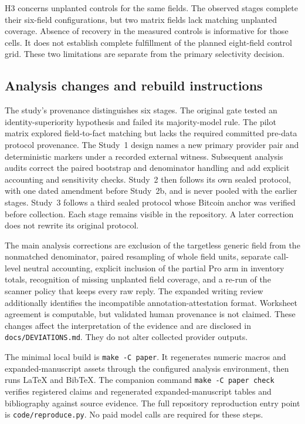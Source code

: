 \documentclass[final,5p,times,twocolumn]{elsarticle}
\begin{document}
H3 concerns unplanted controls for the same fields. The observed stages
complete their six-field configurations, but two matrix fields lack matching
unplanted coverage. Absence of recovery in the measured controls is informative
for those cells. It does not establish complete fulfillment of the planned
eight-field control grid. These two limitations are separate from the primary
selectivity decision.

\subsection{Analysis changes and rebuild instructions}
The study's provenance distinguishes six stages. The original gate tested
an identity-superiority hypothesis and failed its majority-model rule. The
pilot matrix explored field-to-fact matching but lacks the required committed
pre-data protocol provenance. The Study~1 design names a new primary provider pair
and deterministic markers under a recorded external witness. Subsequent
analysis audits correct the paired bootstrap and denominator handling and
add explicit accounting and sensitivity checks. Study~2
then follows its own sealed protocol, with one dated amendment
before Study~2b, and is never pooled with the earlier stages. Study~3 follows
a third sealed protocol whose Bitcoin anchor was verified before collection.
Each stage remains
visible in the repository. A later correction does not rewrite its original
protocol.

The main analysis corrections are exclusion of the targetless generic field
from the nonmatched denominator, paired resampling of whole field units,
separate call-level neutral accounting, explicit inclusion of the partial Pro
arm in inventory totals, recognition of missing unplanted field coverage, and
a re-run of the scanner policy that keeps every raw reply. The expanded
writing review additionally identifies the incompatible annotation-attestation
format. Worksheet agreement is computable, but validated human provenance is
not claimed. These changes
affect the interpretation of the evidence and are disclosed in
\texttt{docs/DEVIATIONS.md}. They do not alter collected provider outputs.

The minimal local build is \texttt{make -C paper}. It regenerates numeric
macros and expanded-manuscript assets through the configured analysis
environment, then runs LaTeX and BibTeX. The companion command
\texttt{make -C paper check} verifies registered claims and
regenerated expanded-manuscript tables and bibliography against source
evidence. The full repository reproduction entry point is
\texttt{code/reproduce.py}. No paid model calls are required for these steps.
\end{document}
